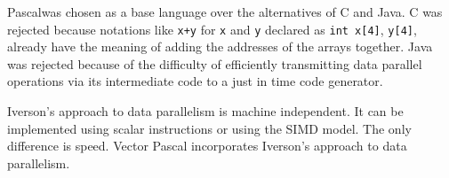 Pascal\cite{Jensen}was chosen as a base language over the alternatives
of C and Java. C was rejected because notations like \texttt{x+y} for \texttt{x}
and \texttt{y} declared as \texttt{int x{[}4{]}}, {\tt y{[}4{]}}, already have the
meaning of adding the addresses of the arrays together. Java was rejected because
of the difficulty of efficiently transmitting data parallel operations via its
intermediate code to a just in time code generator. 

Iverson's approach to data parallelism is machine independent. It can be implemented
using scalar instructions or using the SIMD model. The only difference
is speed. Vector Pascal incorporates Iverson's approach to data parallelism.



